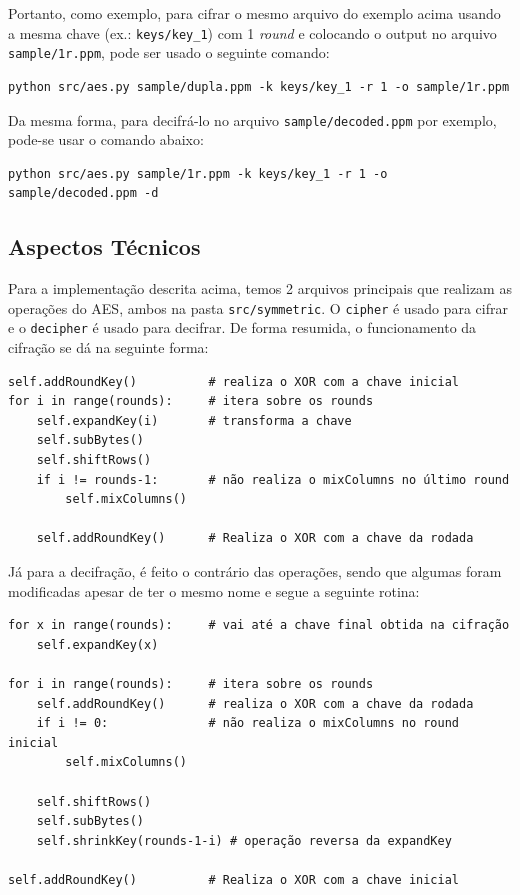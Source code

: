 \documentclass[12pt]{article}
\begin{document}
Portanto, como exemplo, para cifrar o mesmo arquivo do exemplo acima usando a mesma chave (ex.: \texttt{keys/key\_1}) com 1 \textit{round} e colocando o output no arquivo \texttt{sample/1r.ppm}, pode ser usado o seguinte comando:

\begin{lstlisting}
python src/aes.py sample/dupla.ppm -k keys/key_1 -r 1 -o sample/1r.ppm
\end{lstlisting}

Da mesma forma, para decifrá-lo no arquivo \texttt{sample/decoded.ppm} por exemplo, pode-se usar o comando abaixo:

\begin{lstlisting}
python src/aes.py sample/1r.ppm -k keys/key_1 -r 1 -o sample/decoded.ppm -d
\end{lstlisting}

\subsection{Aspectos Técnicos}
Para a implementação descrita acima, temos 2 arquivos principais que realizam as operações do AES, ambos na pasta \texttt{src/symmetric}. O \texttt{cipher} é usado para cifrar e o \texttt{decipher} é usado para decifrar. De forma resumida, o funcionamento da cifração se dá na seguinte forma:

\begin{lstlisting}
self.addRoundKey()          # realiza o XOR com a chave inicial
for i in range(rounds):     # itera sobre os rounds
    self.expandKey(i)       # transforma a chave
    self.subBytes()
    self.shiftRows()
    if i != rounds-1:       # não realiza o mixColumns no último round
        self.mixColumns()
    
    self.addRoundKey()      # Realiza o XOR com a chave da rodada
\end{lstlisting}

Já para a decifração, é feito o contrário das operações, sendo que algumas foram modificadas apesar de ter o mesmo nome e segue a seguinte rotina:

\begin{lstlisting}
for x in range(rounds):     # vai até a chave final obtida na cifração
    self.expandKey(x)

for i in range(rounds):     # itera sobre os rounds
    self.addRoundKey()      # realiza o XOR com a chave da rodada
    if i != 0:              # não realiza o mixColumns no round inicial
        self.mixColumns()

    self.shiftRows()
    self.subBytes()
    self.shrinkKey(rounds-1-i) # operação reversa da expandKey
    
self.addRoundKey()          # Realiza o XOR com a chave inicial
\end{lstlisting}
\end{document}
